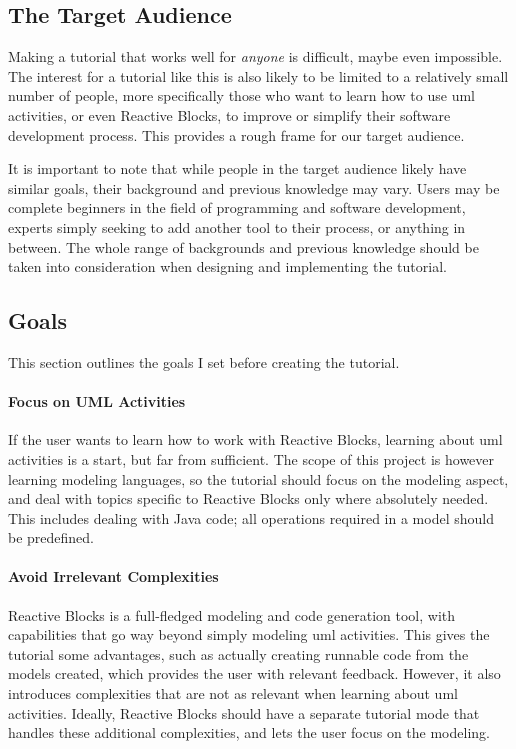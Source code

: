 \subsection{The Target Audience}
\label{sec:target_audience}
Making a tutorial that works well for \emph{anyone} is difficult, maybe even impossible. The interest for a tutorial like this is also likely to be limited to a relatively small number of people, more specifically those who want to learn how to use \gls{uml} activities, or even Reactive Blocks, to improve or simplify their software development process. This provides a rough frame for our target audience.

\noindent
It is important to note that while people in the target audience likely have similar goals, their background and previous knowledge may vary. Users may be complete beginners in the field of programming and software development, experts simply seeking to add another tool to their process, or anything in between. The whole range of backgrounds and previous knowledge should be taken into consideration when designing and implementing the tutorial.

\subsection{Goals}
\label{sec:tutorial_goals}
This section outlines the goals I set before creating the tutorial.

\paragraph{Focus on UML Activities} If the user wants to learn how to work with Reactive Blocks, learning about \gls{uml} activities is a start, but far from sufficient. The scope of this project is however learning modeling languages, so the tutorial should focus on the modeling aspect, and deal with topics specific to Reactive Blocks only where absolutely needed. This includes dealing with Java code; all operations required in a model should be predefined.

\paragraph{Avoid Irrelevant Complexities} Reactive Blocks is a full-fledged modeling and code generation tool, with capabilities that go way beyond simply modeling \gls{uml} activities. This gives the tutorial some advantages, such as actually creating runnable code from the models created, which provides the user with relevant feedback. However, it also introduces complexities that are not as relevant when learning about \gls{uml} activities. Ideally, Reactive Blocks should have a separate tutorial mode that handles these additional complexities, and lets the user focus on the modeling.

